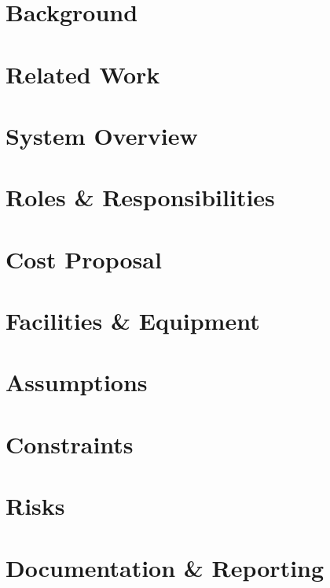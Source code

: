 \documentclass[11pt,letterpaper]{article}
\begin{document}
\section{Background}

\section{Related Work}

\section{System Overview}

\section{Roles \& Responsibilities}

\section{Cost Proposal}

\section{Facilities \& Equipment}

\section{Assumptions}

\section{Constraints}

\section{Risks}

\section{Documentation \& Reporting}

\newpage



{}
\end{document}
